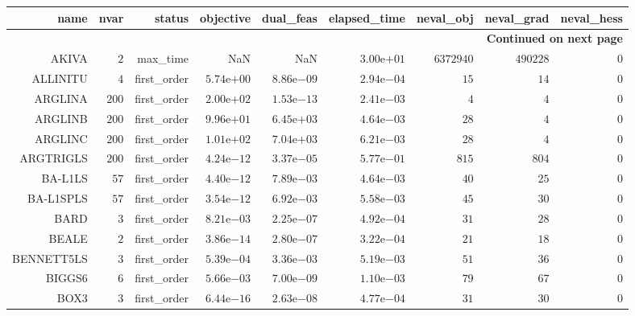 \begin{longtable}{rrrrrrrrr}
\hline
name & nvar & status & objective & dual\_feas & elapsed\_time & neval\_obj & neval\_grad & neval\_hess \\\hline
\endhead
\hline
\multicolumn{9}{r}{{\bfseries Continued on next page}}\\
\hline
\endfoot
\endlastfoot
AKIVA & \(     2\) & max\_time &       NaN &       NaN & \( 3.00\)e\(+01\) & \(6372940\) & \(490228\) & \(     0\) \\
ALLINITU & \(     4\) & first\_order & \( 5.74\)e\(+00\) & \( 8.86\)e\(-09\) & \( 2.94\)e\(-04\) & \(    15\) & \(    14\) & \(     0\) \\
ARGLINA & \(   200\) & first\_order & \( 2.00\)e\(+02\) & \( 1.53\)e\(-13\) & \( 2.41\)e\(-03\) & \(     4\) & \(     4\) & \(     0\) \\
ARGLINB & \(   200\) & first\_order & \( 9.96\)e\(+01\) & \( 6.45\)e\(+03\) & \( 4.64\)e\(-03\) & \(    28\) & \(     4\) & \(     0\) \\
ARGLINC & \(   200\) & first\_order & \( 1.01\)e\(+02\) & \( 7.04\)e\(+03\) & \( 6.21\)e\(-03\) & \(    28\) & \(     4\) & \(     0\) \\
ARGTRIGLS & \(   200\) & first\_order & \( 4.24\)e\(-12\) & \( 3.37\)e\(-05\) & \( 5.77\)e\(-01\) & \(   815\) & \(   804\) & \(     0\) \\
BA-L1LS & \(    57\) & first\_order & \( 4.40\)e\(-12\) & \( 7.89\)e\(-03\) & \( 4.64\)e\(-03\) & \(    40\) & \(    25\) & \(     0\) \\
BA-L1SPLS & \(    57\) & first\_order & \( 3.54\)e\(-12\) & \( 6.92\)e\(-03\) & \( 5.58\)e\(-03\) & \(    45\) & \(    30\) & \(     0\) \\
BARD & \(     3\) & first\_order & \( 8.21\)e\(-03\) & \( 2.25\)e\(-07\) & \( 4.92\)e\(-04\) & \(    31\) & \(    28\) & \(     0\) \\
BEALE & \(     2\) & first\_order & \( 3.86\)e\(-14\) & \( 2.80\)e\(-07\) & \( 3.22\)e\(-04\) & \(    21\) & \(    18\) & \(     0\) \\
BENNETT5LS & \(     3\) & first\_order & \( 5.39\)e\(-04\) & \( 3.36\)e\(-03\) & \( 5.19\)e\(-03\) & \(    51\) & \(    36\) & \(     0\) \\
BIGGS6 & \(     6\) & first\_order & \( 5.66\)e\(-03\) & \( 7.00\)e\(-09\) & \( 1.10\)e\(-03\) & \(    79\) & \(    67\) & \(     0\) \\
BOX3 & \(     3\) & first\_order & \( 6.44\)e\(-16\) & \( 2.63\)e\(-08\) & \( 4.77\)e\(-04\) & \(    31\) & \(    30\) & \(     0\) \\

\end{longtable}
